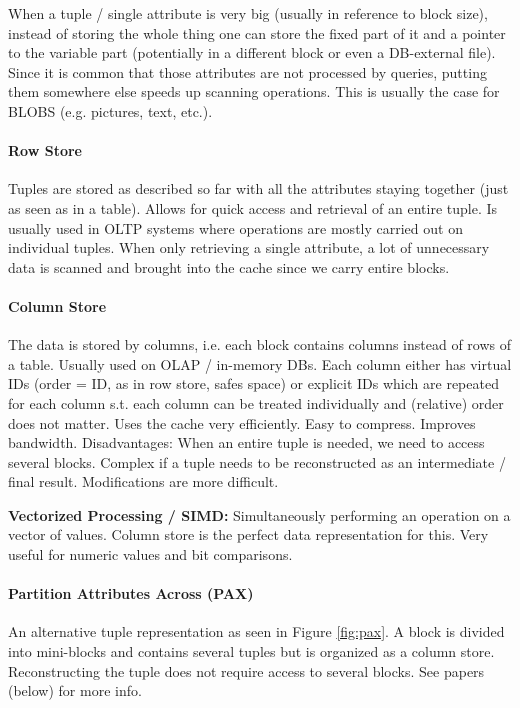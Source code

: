 When a tuple / single attribute is very big (usually in reference to block size), instead of storing the whole thing one can store the fixed part of it and a pointer to the variable part (potentially in a different block or even a DB-external file). Since it is common that those attributes are not processed by queries, putting them somewhere else speeds up scanning operations. This is usually the case for BLOBS (e.g. pictures, text, etc.).

\paragraph{Row Store}
Tuples are stored as described so far with all the attributes staying together (just as seen as in a table). Allows for quick access and retrieval of an entire tuple. Is usually used in OLTP systems where operations are mostly carried out on individual tuples. When only retrieving a single attribute, a lot of unnecessary data is scanned and brought into the cache since we carry entire blocks.

\paragraph{Column Store}
The data is stored by columns, i.e. each block contains columns instead of rows of a table. Usually used on OLAP / in-memory DBs. Each column either has virtual IDs (order = ID, as in row store, safes space) or explicit IDs which are repeated for each column s.t. each column can be treated individually and (relative) order does not matter. Uses the cache very efficiently. Easy to compress. Improves bandwidth. Disadvantages: When an entire tuple is needed, we need to access several blocks. Complex if a tuple needs to be reconstructed as an intermediate / final result. Modifications are more difficult.

\textbf{Vectorized Processing / SIMD:} Simultaneously performing an operation on a vector of values. Column store is the perfect data representation for this. Very useful for numeric values and bit comparisons.

\paragraph{Partition Attributes Across (PAX)}
An alternative tuple representation as seen in Figure \ref{fig:pax}. A block is divided into mini-blocks and contains several tuples but is organized as a column store. Reconstructing the tuple does not require access to several blocks. See papers (below) for more info.

